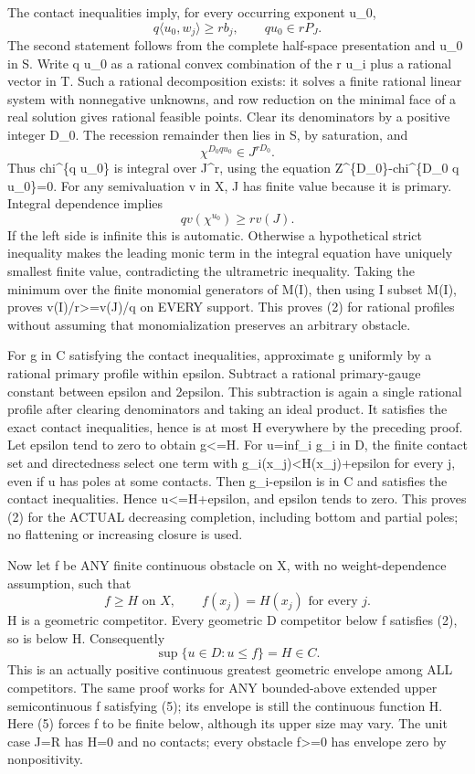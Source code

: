 \documentclass[11pt]{article}
\begin{document}
The contact inequalities imply, for every occurring exponent u\_0,
\[
 q\langle u_0,w_j\rangle\ge r b_j,
 \qquad q u_0\in rP_J.                                    \tag{3}
\]
The second statement follows from the complete half-space presentation and u\_0 in S. Write q u\_0 as a rational convex combination of the r u\_i plus a rational vector in T. Such a rational decomposition exists: it solves a finite rational linear system with nonnegative unknowns, and row reduction on the minimal face of a real solution gives rational feasible points. Clear its denominators by a positive integer D\_0. The recession remainder then lies in S, by saturation, and
\[
 \chi^{D_0 q u_0}\in J^{rD_0}.
\]
Thus chi\textasciicircum{}\{q u\_0\} is integral over J\textasciicircum{}r, using the equation Z\textasciicircum{}\{D\_0\}-chi\textasciicircum{}\{D\_0 q u\_0\}=0. For any semivaluation v in X, J has finite value because it is primary. Integral dependence implies
\[
 qv(\chi^{u_0})\ge r v(J).                                 \tag{4}
\]
If the left side is infinite this is automatic. Otherwise a hypothetical strict inequality makes the leading monic term in the integral equation have uniquely smallest finite value, contradicting the ultrametric inequality. Taking the minimum over the finite monomial generators of M(I), then using I subset M(I), proves v(I)/r>=v(J)/q on EVERY support. This proves (2) for rational profiles without assuming that monomialization preserves an arbitrary obstacle.

For g in C satisfying the contact inequalities, approximate g uniformly by a rational primary profile within epsilon. Subtract a rational primary-gauge constant between epsilon and 2epsilon. This subtraction is again a single rational profile after clearing denominators and taking an ideal product. It satisfies the exact contact inequalities, hence is at most H everywhere by the preceding proof. Let epsilon tend to zero to obtain g<=H. For u=inf\_i g\_i in D, the finite contact set and directedness select one term with g\_i(x\_j)<H(x\_j)+epsilon for every j, even if u has poles at some contacts. Then g\_i-epsilon is in C and satisfies the contact inequalities. Hence u<=H+epsilon, and epsilon tends to zero. This proves (2) for the ACTUAL decreasing completion, including bottom and partial poles; no flattening or increasing closure is used.

Now let f be ANY finite continuous obstacle on X, with no weight-dependence assumption, such that
\[
 f\ge H\text{ on }X,\qquad f(x_j)=H(x_j)\text{ for every }j.             \tag{5}
\]
H is a geometric competitor. Every geometric D competitor below f satisfies (2), so is below H. Consequently
\[
 \sup\{u\in D:u\le f\}=H\in C.
\]
This is an actually positive continuous greatest geometric envelope among ALL competitors. The same proof works for ANY bounded-above extended upper semicontinuous f satisfying (5); its envelope is still the continuous function H. Here (5) forces f to be finite below, although its upper size may vary. The unit case J=R has H=0 and no contacts; every obstacle f>=0 has envelope zero by nonpositivity.
\end{document}
